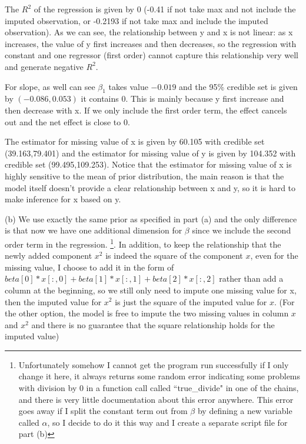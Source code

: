 \documentclass{homeworg}
\begin{document}
The $R^2$ of the regression is given by 0 (-0.41 if not take max and not include the imputed observation, or -0.2193 if not take max and include the imputed observation). As we can see, the relationship between y and x is not linear: as x increases, the value of y first increases and then decreases, so the regression with constant and one regressor (first order) cannot capture this relationship very well and generate negative $R^2$.

For slope, as well can see $\beta_1$ takes value $-0.019$ and the 95\% credible set is given by $(-0.086,0.053)$ it contains 0. This is mainly because y first increase and then decrease with x. If we only include the first order term, the effect cancels out and the net effect is close to 0.

The estimator for missing value of x is given by 60.105 with credible set (39.163,79.401) and the estimator for missing value of y is given by 104.352 with credible set (99.495,109.253). Notice that the estimator for missing value of x is highly sensitive to the mean of prior distribution, the main reason is that the model itself doesn't provide a clear relationship between x and y, so it is hard to make inference for x based on y.



(b) We use exactly the same prior as specified in part (a) and the only difference is that now we have one additional dimension for $\beta$ since we include the second order term in the regression. \footnote{Unfortunately somehow I cannot get the program run successfully if I only change it here, it always returns some random error indicating some problems with division by 0 in a function call called ``true\_divide" in one of the chains, and there is very little documentation about this error anywhere. This error goes away if I split the constant term out from $\beta$ by defining a new variable called $\alpha$, so I decide to do it this way and I create a separate script file for part (b)}. In addition, to keep the relationship that the newly added component $x^2$ is indeed the square of the component $x$, even for the missing value, I choose to add it in the form of $beta[0]*x[:,0]+beta[1]*x[:,1]+beta[2]*x[:,2]$ rather than add a column at the beginning, so we still only need to impute one missing value for x, then the imputed value for $x^2$ is just the square of the imputed value for $x$. (For the other option, the model is free to impute the two missing values in column $x$ and $x^2$ and there is no guarantee that the square relationship holds for the imputed value)
\end{document}
